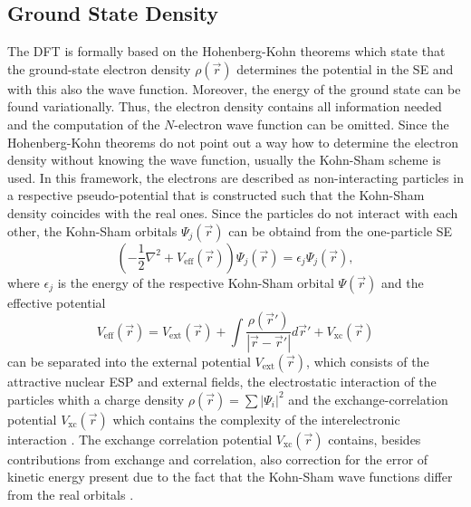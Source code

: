 \subsection{Ground State Density}
\label{ch:dft}
The DFT is formally based on the Hohenberg-Kohn theorems \cite{HohenbergKohn} which state that the ground-state electron density $\rho(\vec{r})$ determines the potential in the SE and with this also the wave function.
Moreover, the energy of the ground state can be found variationally.
Thus, the electron density contains all information needed and the computation of the $N$-electron wave function can be omitted.
Since the Hohenberg-Kohn theorems do not point out a way how to determine the electron density without knowing the wave function, usually the Kohn-Sham scheme \cite{KohnSham} is used.
In this framework, the electrons are described as non-interacting particles in a respective pseudo-potential that is constructed such that the Kohn-Sham density coincides with the real ones.
Since the particles do not interact with each other, the Kohn-Sham orbitals $\Psi_j(\vec{r})$ can be obtaind from the one-particle SE
\begin{equation}
\left( -\frac 12  \nabla^2 + V_\text{eff}(\vec{r}) \right) \Psi_j(\vec{r})=\epsilon_j \Psi_j(\vec{r}),
\end{equation}
where $\epsilon_j$ is the energy of the respective Kohn-Sham orbital $\Psi(\vec{r})$ and the effective potential 
\begin{equation} \label{eq:dftPot}
V_\text{eff}(\vec{r})=V_\text{ext}(\vec{r})+ \int \frac{\rho(\vec{r}')}{|\vec{r}-\vec{r}'|} d\vec{r}' + V_\text{xc}(\vec{r})
\end{equation}
can be separated into the external potential $V_\text{ext}(\vec{r})$, which consists of the attractive nuclear ESP and external fields, the electrostatic interaction of the particles whith a charge density $\rho(\vec{r})=\sum |\Psi_i|^2$ and the exchange-correlation potential $V_\text{xc}(\vec{r})$ which contains the complexity of the interelectronic interaction \cite{baerRSH}.
The exchange correlation potential $V_\text{xc}(\vec{r})$ contains, besides contributions from exchange and correlation, also correction for the error of kinetic energy present due to the fact that the Kohn-Sham wave functions differ from the real orbitals \cite{Holthausen}.

